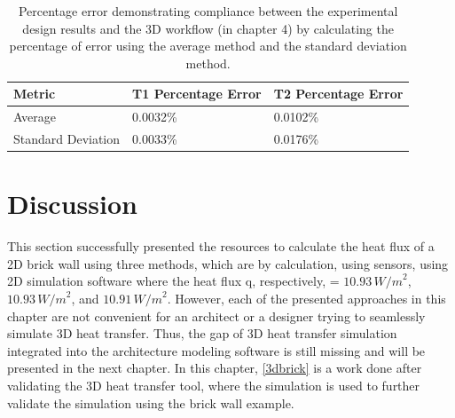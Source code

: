 \begin{table}[H]
 \caption[2D Results Percentage error]{Percentage error demonstrating compliance between the experimental design results and the 3D workflow (in chapter 4) by calculating the percentage of error using the average method and the standard deviation method.}
    \label{error2d}
     \centering
 \begin{tabular}{l l l}
        \toprule
        Metric & T1 Percentage Error & T2 Percentage Error \\
        \midrule
        Average & 0.0032\% & 0.0102\% \\
        Standard Deviation & 0.0033\% & 0.0176\% \\
        \bottomrule
    \end{tabular}
\end{table}

\section{Discussion}
This section successfully presented the resources to calculate the heat flux of a 2D brick wall using three methods, which are by calculation, using sensors, using 2D simulation software where the heat flux q, respectively, = \( 10.93 \, {W/m}^2 \), \( 10.93 \, {W/m}^2 \), and \( 10.91 \, {W/m}^2 \). However, each of the presented approaches in this chapter are not convenient for an architect or a designer trying to seamlessly simulate 3D heat transfer. Thus, the gap of 3D heat transfer simulation integrated into the architecture modeling software is still missing and will be presented in the next chapter. In this chapter, \ref{3dbrick} is a work done after validating the 3D heat transfer tool, where the simulation is used to further validate the simulation using the brick wall example.